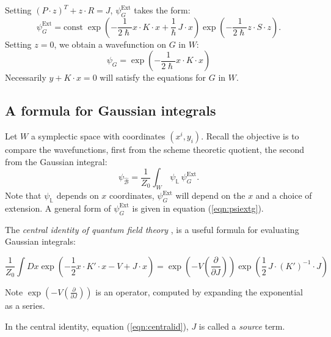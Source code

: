    Setting \((P \cdot z)^T  + z \cdot R = J\), \(\psi_G^{\text{Ext}}\) takes the form:
    \begin{equation}
        \label{eqn:psiextg}
        \psi_G^{\text{Ext}} = \mathrm{const} \; \exp\left( -\frac{1}{2\hslash}  x \cdot K \cdot x + \frac{1}{\hslash}\, J \cdot x \right)  \exp\left( -\frac{1}{2\hslash} z \cdot S \cdot z\right).
    \end{equation} 
    Setting \(z=0\), we obtain a wavefunction on \(G\) in \(W\):
    \[ \psi_G= \exp \left( -\frac{1}{2\hslash}  x \cdot K \cdot x \right)\]
    Necessarily \(y+K\cdot x = 0\) will satisfy the equations for \(G\) in \(W\).
    
    \subsection{A formula for Gaussian integrals}

    Let \(W\) a symplectic space with coordinates \( (x^i,y_i)\).
    Recall the objective is to compare the wavefunctions, first from the scheme theoretic quotient, the second from the Gaussian integral:
    \[ \psi_{\widehat{\mathcal{B}}} = \frac{1}{Z_0} \int_{W} \,  \psi_{\mathbb{L}} \, \psi_G^{\text{Ext}}  . \]
    Note that \( \psi_{\mathbb{L}} \) depends on \(x\) coordinates, \( \psi_G^{\text{Ext}}\) will depend on the \(x\) and a choice of extension. A general form of \( \psi_G^{\text{Ext}}\) is given in equation (\ref{eqn:psiextg}).
    
    
    The \emph{central identity of quantum field theory} \cite{zee}, is a useful formula for evaluating Gaussian integrals:
    \begin{lem}
        \begin{equation} 
        \label{eqn:centralid}
        \frac{1}{Z_0}\int Dx \exp\left(-\frac12 x \cdot K' \cdot x - V + J \cdot x\right) = \exp\left(-V\left(\frac{\partial}{\partial J}\right)\right) \exp\left( \frac12 \, J \cdot (K')^{-1} \cdot J\right) 
    \end{equation}
    \end{lem} 
    Note \(\exp\left(-V\left(\frac{\partial}{\partial J}\right)\right)\) is an operator, computed by expanding the exponential as a series. 
    \begin{rem}
    In the central identity, equation (\ref{eqn:centralid}), \(J\) is called a \emph{source} term.
    \end{rem}
    
